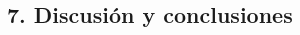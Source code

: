 \begin{spacing}{1.5}
  \begin{tightcenter}
    \section{7. Discusión y conclusiones}
    \mylinespacing
  \end{tightcenter}

  \mylinespacing
  \mylinespacing
  \begin{tightcenter}
  \end{tightcenter}
\end{spacing}
